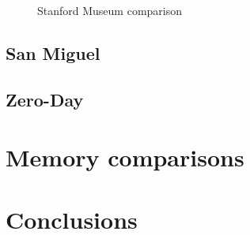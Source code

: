 \begin{figure}
    \centering
    \caption{Stanford Museum comparison}
    \label{fig:smmain_ps1}
\end{figure}




\subsection{San Miguel}


\subsection{Zero-Day}


\section{Memory comparisons}

\section{Conclusions}
